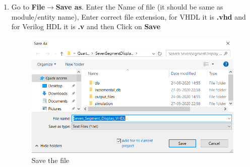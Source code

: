 \documentclass[12pt,singleside,a4paper]{article}
\begin{document}
\begin{enumerate}
    
    \item Go to \textbf{File}$\rightarrow$\textbf{Save as}. Enter the Name of file (it should be same as module/entity name), Enter correct file extension, for VHDL it is \textbf{.vhd} and for Verilog HDL it is \textbf{.v } and then Click on \textbf{Save}
    \begin{figure}[H]
    \centering
    \includegraphics[width=14cm,keepaspectratio]{Project/Create3.png}
    \caption{Save the file}
    \end{figure}
    

\end{enumerate}
\end{document}

